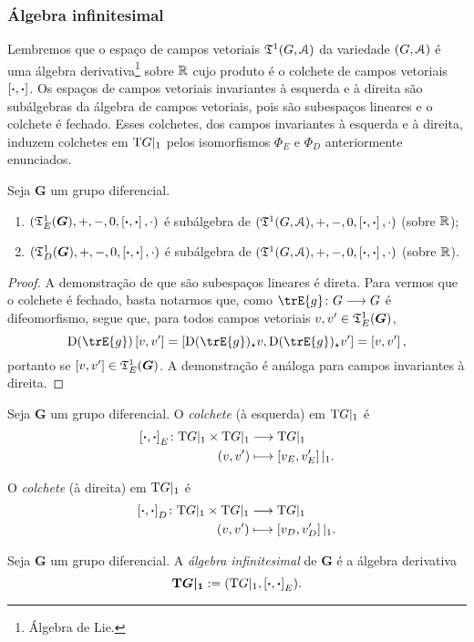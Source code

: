 \subsubsection{Álgebra infinitesimal}

Lembremos que o espaço de campos vetoriais $\mathfrak{T}^1(G,\mathcal{A})$ da variedade $(G,\mathcal{A})$ é uma álgebra derivativa\footnote{Álgebra de Lie.} sobre $\mathbb{R}$ cujo produto é o colchete de campos vetoriais $\left[{\bm{\cdot}},{\bm{\cdot}}\right]$. Os espaços de campos vetoriais invariantes à esquerda e à direita são subálgebras da álgebra de campos vetoriais, pois são subespaços lineares e o colchete é fechado. Esses colchetes, dos campos invariantes à esquerda e à direita, induzem colchetes em $\mathrm{T} G|_1$ pelos isomorfismos $\Phi_E$ e $\Phi_D$ anteriormente enunciados.

\begin{proposition}
Seja $\bm G$ um grupo diferencial.
	\begin{enumerate}
	\item $(\mathfrak{T}^1_E(\bm G),+,-,0,\left[{\bm{\cdot}},{\bm{\cdot}}\right],\cdot)$ é subálgebra de $(\mathfrak{T}^1(G,\mathcal{A}),+,-,0,\left[{\bm{\cdot}},{\bm{\cdot}}\right],\cdot)$ (sobre $\mathbb{R}$);
	\item $(\mathfrak{T}^1_D(\bm G),+,-,0,\left[{\bm{\cdot}},{\bm{\cdot}}\right],\cdot)$ é subálgebra de $(\mathfrak{T}^1(G,\mathcal{A}),+,-,0,\left[{\bm{\cdot}},{\bm{\cdot}}\right],\cdot)$ (sobre $\mathbb{R}$).
	\end{enumerate}
\end{proposition}
\begin{proof}
A demonstração de que são subespaços lineares é direta. Para vermos que o colchete é fechado, basta notarmos que, como $\fun{\trE{g}}{G}{G}$ é difeomorfismo, segue que, para todos campos vetoriais $v,v' \in \mathfrak{T}^1_E(\bm G)$,
	\begin{equation*}
	\D (\trE{g})\col{v}{v'} = \col{\D(\trE{g})\emp v}{\D(\trE{g})\emp v'} = \col{v}{v'},
	\end{equation*}
portanto se $\left[{v},{v'}\right] \in \mathfrak{T}^1_E(\bm G)$. A demonstração é análoga para campos invariantes à direita.
\end{proof}

\begin{definition}
Seja $\bm G$ um grupo diferencial. O \emph{colchete} (à esquerda) em $\mathrm{T} G|_1$ é
	\begin{align*}
	{\left[{\bm{\cdot}},{\bm{\cdot}}\right]_E}\colon {\mathrm{T}G|_1 \times \mathrm{T}G|_1} &\longrightarrow {\mathrm{T}G|_1} \\{(v,v')} &\longmapsto \left[{v_E},{v'_E}\right]|_1.
	\end{align*}

O \emph{colchete} (à direita) em $\mathrm{T} G|_1$ é
	\begin{align*}
	{\left[{\bm{\cdot}},{\bm{\cdot}}\right]_D}\colon {\mathrm{T}G|_1 \times \mathrm{T}G|_1} &\longrightarrow {\mathrm{T}G|_1} \\{(v,v')} &\longmapsto \left[{v_D},{v'_D}\right]|_1.
	\end{align*}
\end{definition}

\begin{definition}
Seja $\bm G$ um grupo diferencial. A \emph{álgebra infinitesimal} de $\bm G$ é a álgebra derivativa
	\begin{equation*}
	\bm{\mathrm{T} G|_1} := (\mathrm{T} G|_1,\left[{\bm{\cdot}},{\bm{\cdot}}\right]_E).
	\end{equation*}
\end{definition}

